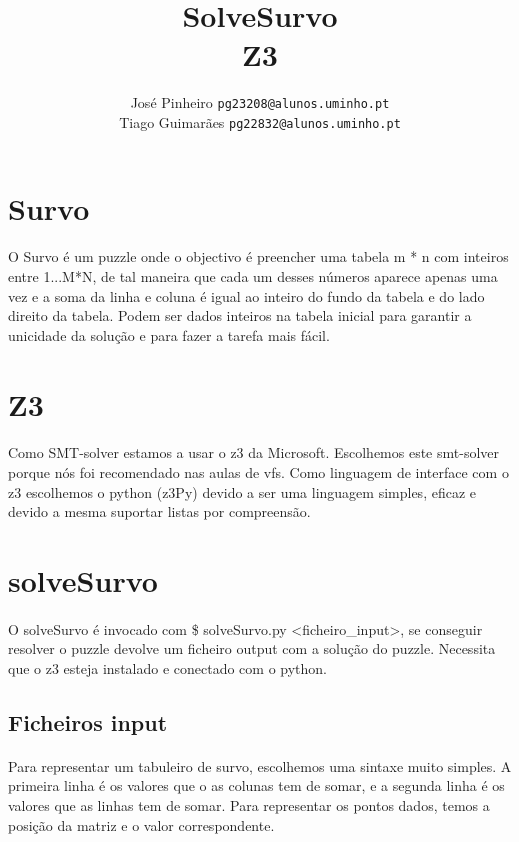 \documentclass{article}
\title{SolveSurvo\\ Z3}
\author{José Pinheiro \texttt{pg23208@alunos.uminho.pt} 
		\\ Tiago Guimarães \texttt{pg22832@alunos.uminho.pt}}
\begin{document}
\maketitle
\newpage
\section{Survo}

\paragraph{} O Survo é um puzzle onde o objectivo é preencher uma tabela m * n com inteiros entre 1...M*N, de tal maneira que cada um desses números aparece apenas uma vez e a soma da linha e coluna é igual ao inteiro do fundo da tabela e do lado direito da tabela. Podem ser dados inteiros na tabela inicial para garantir a unicidade da solução e para fazer a tarefa mais fácil.

\section{Z3}

\paragraph{} Como SMT-solver estamos a usar o z3 da Microsoft. Escolhemos este smt-solver porque nós foi recomendado nas aulas de vfs. Como linguagem de interface com o z3 escolhemos o python (z3Py) devido a ser uma linguagem simples, eficaz e devido a mesma suportar listas por compreensão.

\section{solveSurvo}

\paragraph{} O solveSurvo é invocado com \$ solveSurvo.py <ficheiro\_input>, se conseguir resolver o puzzle devolve um ficheiro output com a solução do puzzle. Necessita que o z3 esteja instalado e conectado com o python.

\subsection{Ficheiros input}

\paragraph{} Para representar um tabuleiro de survo, escolhemos uma sintaxe muito simples.
A primeira linha é os valores que o as colunas tem de somar, e a segunda linha é os valores que as linhas tem de somar.
Para representar os pontos dados, temos a posição da matriz e o valor correspondente.
\end{document}
